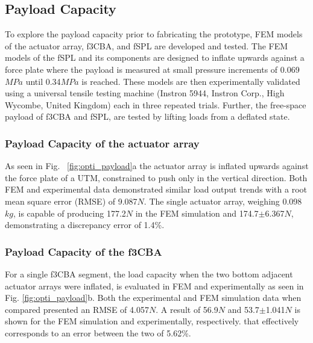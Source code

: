 \documentclass[letterpaper, 10 pt, conference]{ieeeconf}  %
\begin{document}
\subsection{Payload Capacity}

To explore the payload capacity prior to fabricating the prototype, FEM models of the actuator array, f3CBA, and fSPL are developed and tested. The FEM models of the fSPL and its components are designed to inflate upwards against a force plate where the payload is measured at small pressure increments of  0.069$MPa$ until 0.34$MPa$ is reached. These models are then experimentally validated using a universal tensile testing machine (Instron 5944, Instron Corp., High Wycombe, United Kingdom) each in three repeated trials. Further, the free-space payload of f3CBA and fSPL, are tested by lifting loads from a deflated state. 
%
%
% 
% 

\subsubsection{Payload Capacity of the actuator array}
\label{sec:act_array_fem_real}

As seen in Fig. ~\ref{fig:opti_payload}a the actuator array is inflated upwards against the force plate of a UTM, constrained to push only in the vertical direction. Both FEM and experimental data demonstrated similar load output trends with a root mean square error (RMSE) of 9.087$N$. The single actuator array, weighing 0.098$kg$, is capable of producing 177.2$N$ in the FEM simulation and 174.7$\pm$6.367$N$, demonstrating a discrepancy error of 1.4\%. 


\subsubsection{Payload Capacity of the f3CBA}

For a single f3CBA segment, the load capacity when the two bottom adjacent actuator arrays were inflated, is evaluated in FEM and experimentally as seen in Fig. \ref{fig:opti_payload}b. Both the experimental and FEM simulation data when compared presented an RMSE of 4.057$N$. A result of 56.9$N$ and 53.7$\pm$1.041$N$ is shown for the FEM simulation and experimentally, respectively. that effectively corresponds to an error between the two of 5.62\%. 
% 
% 
\end{document}
